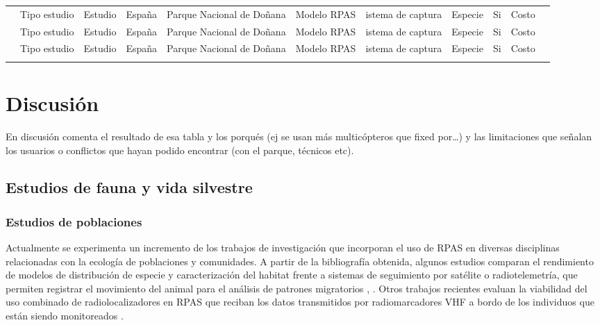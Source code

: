 \documentclass[11pt,]{article}
\begin{document}
\begin{sidewaystable}
\begin{tabular}{p{2.5cm}p{1cm}p{3cm}p{1cm}p{2cm}p{2cm}p{1cm}p{2cm}p{2cm}p{1cm}p{0.5cm}}
\cite{Frederick2009}  & Tipo estudio & Estudio & España & Parque Nacional de Doñana & Modelo RPAS & istema de captura & Especie & Si & Costo  \\ 
\cite{PazmanyMulero2015}  & Tipo estudio & Estudio & España & Parque Nacional de Doñana & Modelo RPAS  & istema de captura & Especie & Si & Costo  \\ 
\cite{PazmanyMulero2015}  & Tipo estudio & Estudio & España & Parque Nacional de Doñana & Modelo RPAS  & istema de captura & Especie & Si & Costo  \\ \\ \cmidrule(r){1-11}
\end{tabular}
\end{sidewaystable}

\section{Discusión}\label{discusion}

En discusión comenta el resultado de esa tabla y los porqués (ej se usan
más multicópteros que fixed por\ldots{}) y las limitaciones que señalan
los usuarios o conflictos que hayan podido encontrar (con el parque,
técnicos etc).

\subsection{Estudios de fauna y vida
silvestre}\label{estudios-de-fauna-y-vida-silvestre}

\subsubsection{Estudios de poblaciones}\label{estudios-de-poblaciones}

Actualmente se experimenta un incremento de los trabajos de
investigación que incorporan el uso de RPAS en diversas disciplinas
relacionadas con la ecología de poblaciones y comunidades. A partir de
la bibliografía obtenida, algunos estudios comparan el rendimiento de
modelos de distribución de especie y caracterización del habitat frente
a sistemas de seguimiento por satélite o radiotelemetría, que permiten
registrar el movimiento del animal para el análisis de patrones
migratorios \citep{PazmanyMulero2015}, \citep{Mulero-Pazmany2015}. Otros
trabajos recientes evaluan la viabilidad del uso combinado de
radiolocalizadores en RPAS que reciban los datos transmitidos por
radiomarcadores VHF a bordo de los individuos que están siendo
monitoreados \citep{Bayram2016}.
\end{document}
